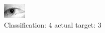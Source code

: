 \begin{figure}[h!]
\begin{center}
\includegraphics[width=0.60\columnwidth]{figures/ID1282_class_4_target_3.png}
\end{center}
\caption{ Classification: 4 actual target: 3}
\label{fig:ID1282_class_4_target_3}
\end{figure}
